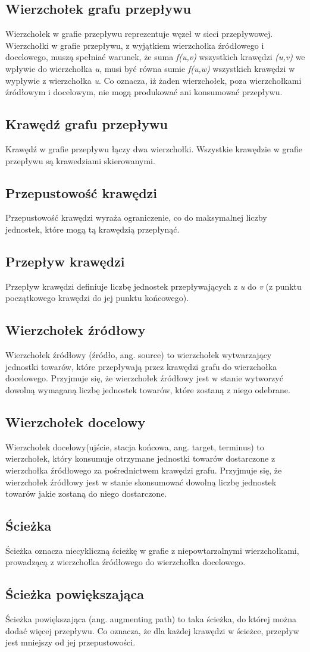 \documentclass[10pt]{minutes}
\begin{document}
\subsection{Wierzchołek grafu przepływu}
Wierzchołek w grafie przepływu reprezentuje węzeł w sieci przepływowej. Wierzchołki w grafie przepływu, z wyjątkiem wierzchołka źródłowego i docelowego, muszą spełniać warunek, że suma \emph{f(u,v)} wszystkich krawędzi \emph{(u,v)} we wpływie do wierzchołka \emph{u}, musi być równa sumie \emph{f(u,w)} wszystkich krawędzi w wypływie z wierzchołka \emph{u}. Co oznacza, iż żaden wierzchołek, poza wierzchołkami źródłowym i docelowym, nie mogą produkować ani konsumować przepływu.
\subsection{Krawędź grafu przepływu}
Krawędź w grafie przepływu łączy dwa wierzchołki. Wszystkie krawędzie w grafie przepływu są krawedziami skierowanymi.
\subsection{Przepustowość krawędzi}
Przepustowość krawędzi wyraża ograniczenie, co do maksymalnej liczby jednostek, które mogą tą krawędzią przepłynąć.
\subsection{Przepływ krawędzi}
Przepływ krawędzi definiuje liczbę jednostek przepływających z \emph{u} do \emph{v} (z punktu początkowego krawędzi do jej punktu końcowego).
\subsection{Wierzchołek źródłowy}
Wierzchołek źródłowy (źródło, ang. source) to wierzchołek wytwarzający jednostki towarów, które przepływają przez krawędzi grafu do wierzchołka docelowego. Przyjmuje się, że wierzchołek źródłowy jest w stanie wytworzyć dowolną wymaganą liczbę jednostek towarów, które zostaną z niego odebrane.
\subsection{Wierzchołek docelowy}
Wierzchołek docelowy(ujście, stacja końcowa, ang. target, terminus) to wierzchołek, który konsumuje otrzymane jednostki towarów dostarczone z wierzchołka źródłowego za pośrednictwem krawędzi grafu. Przyjmuje się, że wierzchołek źródłowy jest w stanie skonsumować dowolną liczbę jednostek towarów jakie zostaną do niego dostarczone.
\subsection{Ścieżka}
Ścieżka oznacza niecykliczną ścieżkę w grafie z niepowtarzalnymi wierzchołkami, prowadzącą z wierzchołka źródłowego do wierzchołka docelowego.
\subsection{Ścieżka powiększająca}
Ścieżka powiększająca (ang. augmenting path) to taka ścieżka, do której można dodać więcej przepływu. Co oznacza, że dla każdej krawędzi w ścieżce, przepływ jest mniejszy od jej przepustowości.
\end{document}
